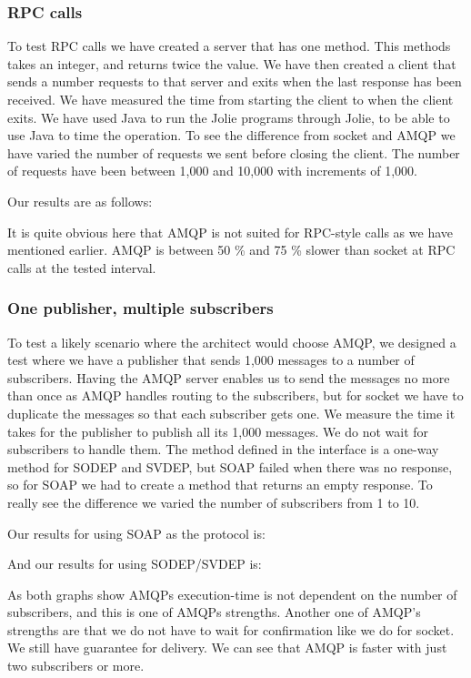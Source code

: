 \subsubsection{RPC calls}
To test RPC calls we have created a server that has one method. This methods takes an integer, and returns twice the value. We have then created a client that sends a number requests to that server and exits when the last response has been received. We have measured the time from starting the client to when the client exits. We have used Java to run the Jolie programs through Jolie, to be able to use Java to time the operation. To see the difference from socket and AMQP we have varied the number of requests we sent before closing the client. The number of requests have been between 1,000 and 10,000 with increments of 1,000.

Our results are as follows:


It is quite obvious here that AMQP is not suited for RPC-style calls as we have mentioned earlier. AMQP is between 50 \% and 75 \% slower than socket at RPC calls at the tested interval.

\subsubsection{One publisher, multiple subscribers}
To test a likely scenario where the architect would choose AMQP, we designed a test where we have a publisher that sends 1,000 messages to a number of subscribers. Having the AMQP server enables us to send the messages no more than once as AMQP handles routing to the subscribers, but for socket we have to duplicate the messages so that each subscriber gets one. We measure the time it takes for the publisher to publish all its 1,000 messages. We do not wait for subscribers to handle them. The method defined in the interface is a one-way method for SODEP and SVDEP, but SOAP failed when there was no response, so for SOAP we had to create a method that returns an empty response. To really see the difference we varied the number of subscribers from 1 to 10.

Our results for using SOAP as the protocol is:



And our results for using SODEP/SVDEP is:



As both graphs show AMQPs execution-time is not dependent on the number of subscribers, and this is one of AMQPs strengths. Another one of AMQP's strengths are that we do not have to wait for confirmation like we do for socket. We still have guarantee for delivery\cite{AmqpTransport}. We can see that AMQP is faster with just two subscribers or more.
